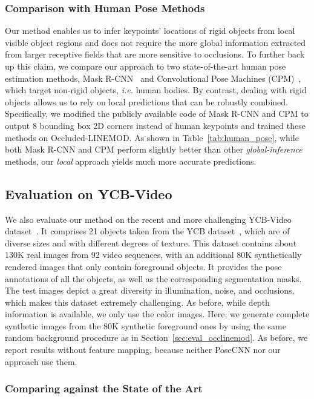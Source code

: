 \documentclass[10pt,twocolumn,letterpaper]{article}
\begin{document}
\subsubsection{Comparison with Human Pose Methods}
Our method enables us to infer keypoints' locations of rigid objects from local visible object regions and does not require the more global information extracted from larger receptive fields that are more sensitive to occlusions. To further back up this claim, we compare our approach to two state-of-the-art human pose estimation methods, Mask R-CNN~\cite{He17} and Convolutional Pose Machines (CPM)~\cite{Wei16}, which target non-rigid objects, {\it i.e.} human bodies. By contrast, dealing with rigid objects allows us to rely on local predictions that can be robustly combined. Specifically, we modified the publicly available code of Mask R-CNN and CPM to output 8 bounding box 2D corners instead of human keypoints and trained these methods on Occluded-LINEMOD. As shown in Table~\ref{tab:human_pose}, while both Mask R-CNN and CPM perform slightly better than other \emph{global-inference} methods, our \emph{local} approach yields much more accurate predictions.

\subsection{Evaluation on YCB-Video}

We also evaluate our method on the recent and more challenging YCB-Video dataset~\cite{Xiang18b}. It comprises 21 objects taken from the YCB dataset~\cite{Calli15,Calli17}, which are of diverse sizes and with different degrees of texture. This dataset contains about 130K real images from 92 video sequences, with an additional 80K synthetically rendered images that only contain foreground objects. It provides the pose annotations of all the objects, as well as the corresponding segmentation masks. The test images depict a great diversity in illumination, noise, and occlusions, which makes this dataset extremely challenging. As before, while depth information is available, we only use the color images. Here, we generate complete synthetic images from the 80K synthetic foreground ones by using the same random background procedure as in Section~\ref{sec:eval_occlinemod}. As before, we report results without feature mapping, because neither PoseCNN nor our approach use them. 

\subsubsection{Comparing against the State of the Art}
\end{document}
